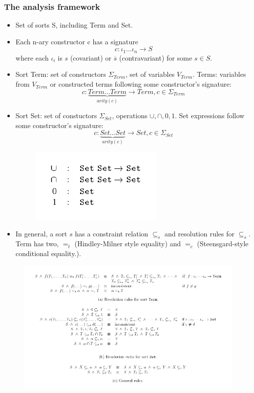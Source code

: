 \documentclass{beamer}
\begin{document}
\begin{frame}[allowframebreaks]
  \frametitle {The analysis framework}
  \begin{itemize}
    \item Set of sorts S, including Term and Set.
    \item Each n-ary constructor c has a signature $$ c: \iota_1
      \dotso \iota_n \rightarrow S $$
      where each $\iota_i$ is $s$ (covariant) or $\overline{s}$
      (contravariant) for some $s \in S$.
    \item Sort Term: set of constructors $\Sigma_{Term}$, 
      set of variables $V_{Term}$. Terms: variables from $V_{Term}$ or
      constructed terms following some constructor's signature:
      $$ c:\underbrace{Term \dotso Term}_{arity(c)}  \rightarrow Term,
      c \in \Sigma_{Term} $$
    \item Sort Set: set of constuctors $\Sigma_{Set}$, operations
      ${\cup, \cap, 0, 1}$. Set expressions follow some constructor's
      signature: 
      $$ c:\underbrace{Set \dotso Set}_{arity(c)} \rightarrow Set,
      c \in \Sigma_{Set} $$
      \begin{figure}
        \centering
        \includegraphics[scale=0.3]{set_operations.png}
      \end{figure}
    \item In general, a sort $s$ has a constraint relation
      $\subseteq_s$ and resolution rules for $\subseteq_s$. Term has
      two, $=_t$ (Hindley-Milner style equality) and $=_c$
      (Steensgard-style conditional equality.).
  \end{itemize}

  \begin{figure}
    \centering
    \includegraphics[scale=0.3]{resolution_rules.png}
  \end{figure}

\end{frame}
\end{document}
